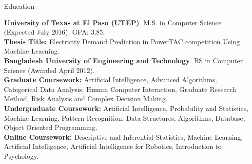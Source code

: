 \documentclass[]{mcdowellcv}
\begin{document}
	\makeheader
	
	
	\begin{cvsection}{Education}
		\begin{cvsubsection}{}{}{}
				\textbf{University of Texas at El Paso (UTEP)}. M.S. in Computer Science (Expected July 2016). GPA: 3.85. \\
				\textbf{Thesis Title:} Electricity Demand Prediction in PowerTAC competition Using Machine Learning. \\
				\textbf{Bangladesh University of Engineering and Technology}. BS in Computer Science (Awarded April 2012).  \\
				\textbf{Graduate Coursework:} Artificial Intelligence, Advanced Algorithms, Categorical Data Analysis, Human Computer Interaction, Graduate Research Method, Risk Analysis and Complex Decision Making. \\
				\textbf{Undergraduate Coursework:} Artificial Intelligence, Probability and Statistics, Machine Learning, Pattern Recognition, Data Structures, Algorithms, Database, Object Oriented Programming. \\
				\textbf{Online Coursework:} Descriptive and Inferential Statistics, Machine Learning, Artificial Intelligence, Artificial Intelligence for Robotics, Introduction to Psychology.
		\end{cvsubsection}
	\end{cvsection}
\end{document}
